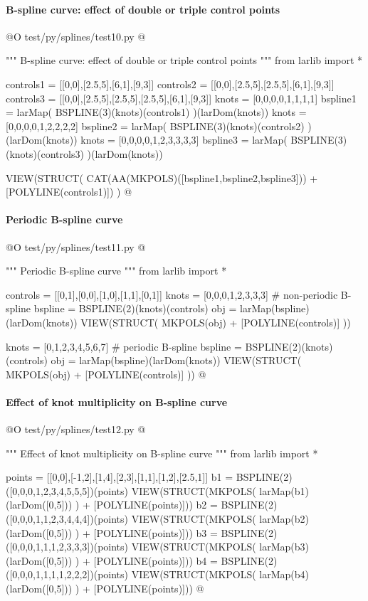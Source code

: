 \documentclass[11pt,oneside]{article}	%
\begin{document}
\paragraph{B-spline curve: effect of double or triple control points}


@O test/py/splines/test10.py
@{""" B-spline curve: effect of double or triple control points """
from larlib import *

controls1 = [[0,0],[2.5,5],[6,1],[9,3]]
controls2 = [[0,0],[2.5,5],[2.5,5],[6,1],[9,3]]
controls3 = [[0,0],[2.5,5],[2.5,5],[2.5,5],[6,1],[9,3]]
knots = [0,0,0,0,1,1,1,1]
bspline1 = larMap( BSPLINE(3)(knots)(controls1) )(larDom(knots))
knots = [0,0,0,0,1,2,2,2,2]
bspline2 = larMap( BSPLINE(3)(knots)(controls2) )(larDom(knots))
knots = [0,0,0,0,1,2,3,3,3,3]
bspline3 = larMap( BSPLINE(3)(knots)(controls3) )(larDom(knots))

VIEW(STRUCT( CAT(AA(MKPOLS)([bspline1,bspline2,bspline3])) + 
	[POLYLINE(controls1)]) )
@}


\paragraph{Periodic B-spline curve}

@O test/py/splines/test11.py
@{""" Periodic B-spline curve """
from larlib import *

controls = [[0,1],[0,0],[1,0],[1,1],[0,1]]
knots = [0,0,0,1,2,3,3,3]				# non-periodic B-spline
bspline = BSPLINE(2)(knots)(controls)
obj = larMap(bspline)(larDom(knots))  
VIEW(STRUCT( MKPOLS(obj) + [POLYLINE(controls)] ))

knots = [0,1,2,3,4,5,6,7]				# periodic B-spline
bspline = BSPLINE(2)(knots)(controls) 	
obj = larMap(bspline)(larDom(knots))
VIEW(STRUCT( MKPOLS(obj) + [POLYLINE(controls)] ))
@}

\paragraph{Effect of knot multiplicity on B-spline curve}


@O test/py/splines/test12.py
@{""" Effect of knot multiplicity on B-spline curve """
from larlib import *

points = [[0,0],[-1,2],[1,4],[2,3],[1,1],[1,2],[2.5,1]]
b1 = BSPLINE(2)([0,0,0,1,2,3,4,5,5,5])(points)
VIEW(STRUCT(MKPOLS( larMap(b1)(larDom([0,5])) ) + [POLYLINE(points)]))
b2 = BSPLINE(2)([0,0,0,1,1,2,3,4,4,4])(points)
VIEW(STRUCT(MKPOLS( larMap(b2)(larDom([0,5])) ) + [POLYLINE(points)]))
b3 = BSPLINE(2)([0,0,0,1,1,1,2,3,3,3])(points)
VIEW(STRUCT(MKPOLS( larMap(b3)(larDom([0,5])) ) + [POLYLINE(points)]))
b4 = BSPLINE(2)([0,0,0,1,1,1,1,2,2,2])(points)
VIEW(STRUCT(MKPOLS( larMap(b4)(larDom([0,5])) ) + [POLYLINE(points)]))
@}
\end{document}
